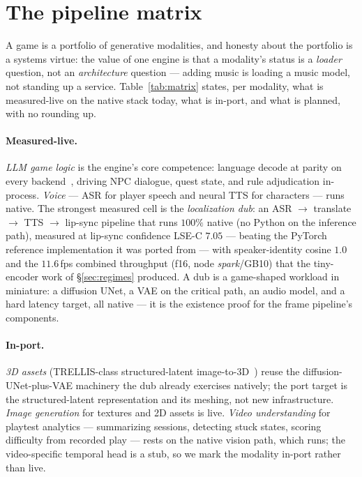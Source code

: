 \documentclass[11pt]{article}
\begin{document}
\section{The pipeline matrix}
\label{sec:matrix}

A game is a portfolio of generative modalities, and honesty about the portfolio is a systems virtue: the value
of one engine is that a modality's status is a \emph{loader} question, not an \emph{architecture} question ---
adding music is loading a music model, not standing up a service. Table~\ref{tab:matrix} states, per modality,
what is measured-live on the native stack today, what is in-port, and what is planned, with no rounding up.

\paragraph{Measured-live.} \emph{LLM game logic} is the engine's core competence: language decode at
 parity on every backend~\cite{backend}, driving NPC dialogue, quest state, and rule
adjudication in-process. \emph{Voice} --- ASR for player speech and neural TTS for characters --- runs native.
The strongest measured cell is the \emph{localization dub}: an ASR $\to$ translate $\to$ TTS $\to$ lip-sync
pipeline that runs $100\%$ native (no Python on the inference path), measured at lip-sync confidence
LSE-C $7.05$ --- beating the PyTorch reference implementation it was ported from --- with speaker-identity
cosine $1.0$ and the $11.6$\,fps combined throughput (f16, node \emph{spark}/GB10) that the tiny-encoder work
of \S\ref{sec:regimes} produced. A dub is a game-shaped workload in miniature: a diffusion UNet, a VAE on the
critical path, an audio model, and a hard latency target, all native --- it is the existence proof for the
frame pipeline's components.

\paragraph{In-port.} \emph{3D assets} (TRELLIS-class structured-latent image-to-3D~\cite{trellis}) reuse the
diffusion-UNet-plus-VAE machinery the dub already exercises natively; the port target is the structured-latent
representation and its meshing, not new infrastructure. \emph{Image generation} for textures and 2D assets is
live. \emph{Video understanding} for playtest analytics --- summarizing sessions, detecting stuck states,
scoring difficulty from recorded play --- rests on the native vision path, which runs; the video-specific
temporal head is a stub, so we mark the modality in-port rather than live.
\end{document}
